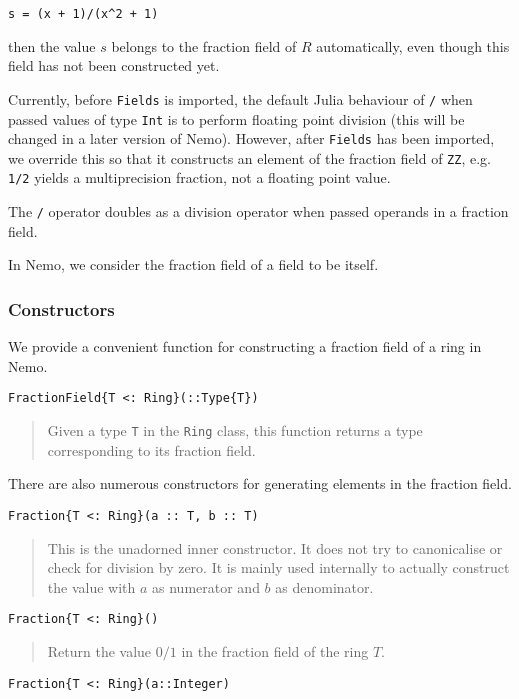\documentclass[a4paper,10pt]{article}
\newcommand{\code}{\lstinline}
\newcommand{\desc}[1]{\vspace{-3mm}\begin{quote}#1\end{quote}}
\begin{document}
{{{\begin{lstlisting}
s = (x + 1)/(x^2 + 1)
\end{lstlisting}

then the value $s$ belongs to the fraction field of $R$ automatically, even
though this field has not been constructed yet.

Currently, before \code{Fields} is imported, the default Julia behaviour of
\code{/} when passed values of type \code{Int} is to perform floating point
division (this will be changed in a later version of Nemo). However, after 
\code{Fields} has been imported, we override this so that it constructs an
element of the fraction field of \code{ZZ}, e.g. \code{1/2} yields a 
multiprecision fraction, not a floating point value.

The \code{/} operator doubles as a division operator when passed operands
in a fraction field.

In Nemo, we consider the fraction field of a field to be itself.

\subsubsection{Constructors}

We provide a convenient function for constructing a fraction field of a ring in
Nemo.

\begin{lstlisting}
FractionField{T <: Ring}(::Type{T})
\end{lstlisting}

\desc{Given a type \code{T} in the \code{Ring} class, this function returns a
type corresponding to its fraction field.}

There are also numerous constructors for generating elements in the fraction
field.

\begin{lstlisting}
Fraction{T <: Ring}(a :: T, b :: T)
\end{lstlisting}

\desc{This is the unadorned inner constructor. It does not try to canonicalise
or check for division by zero. It is mainly used internally to actually 
construct the value with $a$ as numerator and $b$ as denominator.}

\begin{lstlisting}
Fraction{T <: Ring}()
\end{lstlisting}

\desc{Return the value $0/1$ in the fraction field of the ring $T$.}

\begin{lstlisting}
Fraction{T <: Ring}(a::Integer)
\end{lstlisting}

}}}
\end{document}
